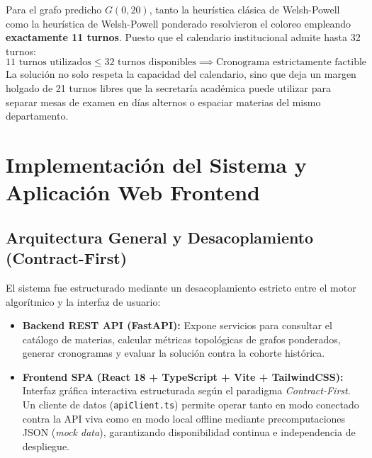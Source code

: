 \documentclass[11pt,a4paper]{article}
\begin{document}
Para el grafo predicho $G(0,20)$, tanto la heurística clásica de Welsh-Powell como la heurística de Welsh-Powell ponderado resolvieron el coloreo empleando \textbf{exactamente 11 turnos}. Puesto que el calendario institucional admite hasta 32 turnos:
\begin{equation}
    11 \text{ turnos utilizados} \le 32 \text{ turnos disponibles} \implies \text{Cronograma estrictamente factible}
\end{equation}
La solución no solo respeta la capacidad del calendario, sino que deja un margen holgado de 21 turnos libres que la secretaría académica puede utilizar para separar mesas de examen en días alternos o espaciar materias del mismo departamento.

\section{Implementación del Sistema y Aplicación Web Frontend}

\subsection{Arquitectura General y Desacoplamiento (Contract-First)}
El sistema fue estructurado mediante un desacoplamiento estricto entre el motor algorítmico y la interfaz de usuario:
\begin{itemize}
    \item \textbf{Backend REST API (FastAPI):} Expone servicios para consultar el catálogo de materias, calcular métricas topológicas de grafos ponderados, generar cronogramas y evaluar la solución contra la cohorte histórica.
    \item \textbf{Frontend SPA (React 18 + TypeScript + Vite + TailwindCSS):} Interfaz gráfica interactiva estructurada según el paradigma \textit{Contract-First}. Un cliente de datos (\texttt{apiClient.ts}) permite operar tanto en modo conectado contra la API viva como en modo local offline mediante precomputaciones JSON (\textit{mock data}), garantizando disponibilidad continua e independencia de despliegue.
\end{itemize}
\end{document}
